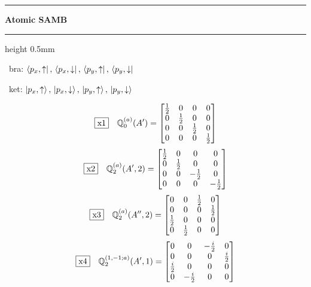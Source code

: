 \documentclass[fleqn,10pt,landscape]{jsarticle}
\begin{document}
\vspace{5mm}
\noindent \rule[0.5mm]{5mm}{0.5mm}\hspace{3mm}\textbf{Atomic SAMB}\hspace{3mm}\leaders\hrule height 0.5mm\hfill\kern0pt
\vspace{3mm}

\vspace{5mm}

\noindent\textbullet\, bra: $\bra{p_{x},\uparrow},\, \bra{p_{x},\downarrow},\, \bra{p_{y},\uparrow},\, \bra{p_{y},\downarrow}$

\noindent\textbullet\, ket: $\ket{p_{x},\uparrow},\, \ket{p_{x},\downarrow},\, \ket{p_{y},\uparrow},\, \ket{p_{y},\downarrow}$

\begin{dmath*}
\fbox{x1}\quad \mathbb{Q}_{0}^{(a)}(A^{\prime})=\begin{bmatrix} \frac{1}{2} & 0 & 0 & 0 \\ 0 & \frac{1}{2} & 0 & 0 \\ 0 & 0 & \frac{1}{2} & 0 \\ 0 & 0 & 0 & \frac{1}{2} \end{bmatrix}
\end{dmath*}
\begin{dmath*}
\fbox{x2}\quad \mathbb{Q}_{2}^{(a)}(A^{\prime},2)=\begin{bmatrix} \frac{1}{2} & 0 & 0 & 0 \\ 0 & \frac{1}{2} & 0 & 0 \\ 0 & 0 & - \frac{1}{2} & 0 \\ 0 & 0 & 0 & - \frac{1}{2} \end{bmatrix}
\end{dmath*}
\begin{dmath*}
\fbox{x3}\quad \mathbb{Q}_{2}^{(a)}(A^{\prime\prime},2)=\begin{bmatrix} 0 & 0 & \frac{1}{2} & 0 \\ 0 & 0 & 0 & \frac{1}{2} \\ \frac{1}{2} & 0 & 0 & 0 \\ 0 & \frac{1}{2} & 0 & 0 \end{bmatrix}
\end{dmath*}
\begin{dmath*}
\fbox{x4}\quad \mathbb{Q}_{2}^{(1,-1;a)}(A^{\prime},1)=\begin{bmatrix} 0 & 0 & - \frac{i}{2} & 0 \\ 0 & 0 & 0 & \frac{i}{2} \\ \frac{i}{2} & 0 & 0 & 0 \\ 0 & - \frac{i}{2} & 0 & 0 \end{bmatrix}
\end{dmath*}
\end{document}
